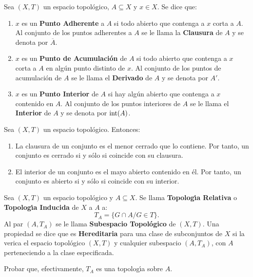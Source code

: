\documentclass[cursovd_portada.tex]{subfiles}
\begin{document}
\begin{defi}
Sea $(X,T)$ un espacio topol\'{o}gico, $A\subseteq X$ y $x\in X$. Se dice que:
\begin{enumerate}
\item $x$ es un {\bf Punto Adherente} a $A$ si todo abierto que contenga a $x$ corta a $A$. Al conjunto de los
puntos adherentes a $A$ se le llama la {\bf Clausura} de $A$ y se denota por $\overline{A}$.
\item $x$ es un {\bf Punto de Acumulaci\'{o}n} de $A$ si todo abierto que contenga a $x$ corta a $A$ en alg\'{u}n punto distinto
de $x$. Al conjunto de los puntos de acumulaci\'{o}n de $A$ se le llama el {\bf Derivado} de $A$ y se denota por $A'$.
\item $x$ es un {\bf Punto Interior} de $A$ si hay alg\'{u}n abierto que contenga a $x$ contenido en $A$. Al conjunto de los
puntos interiores de $A$ se le llama el {\bf Interior} de $A$ y se denota por ${\rm int}(A)$.
\end{enumerate}
\end{defi}

\newpage

\begin{prop}
Sea $(X,T)$ un espacio topol\'{o}gico. Entonces:
\begin{enumerate}
\item La clausura de un conjunto es el menor cerrado que lo contiene. Por tanto, un conjunto es cerrado si y s\'{o}lo
si coincide con su clausura.
\item El interior de un conjunto es el mayo abierto contenido en \'{e}l. Por tanto, un conjunto es abierto si y s\'{o}lo
si coincide con su interior.
\end{enumerate}
\end{prop}
\begin{defi}
Sea $(X,T)$ un espacio topol\'{o}gico y $A\subseteq X$. Se llama {\bf To\-po\-lo\-g\'{\i}a Relativa} o {\bf Topolog\'{\i}a
Inducida} de $X$ a $A$ a:
$$T_A=\{G\cap A/G\in T\}.$$
\hs Al par $(A,T_A)$ se le llama {\bf Subespacio Topol\'{o}gico} de $(X,T)$. Una propiedad se dice que es {\bf
Hereditaria} para una clase de subconjuntos de $X$ si la verica el espacio topol\'{o}gico $(X,T)$ y cualquier
subespacio $(A,T_A)$, con $A$ perteneciendo a la clase especificada.
\end{defi}
\begin{ejer}
{\rm Probar que, efectivamente, $T_A$ es una topolog\'{\i}a sobre $A$.}
\end{ejer}
\end{document}
